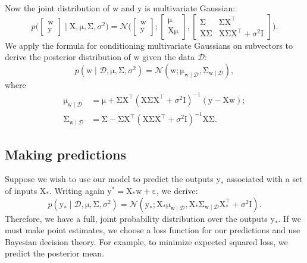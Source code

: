 \documentclass{article}
\newcommand{\given}{\mid}
\newcommand{\mc}[1]{\mathcal{#1}}
\newcommand{\data}{\mc{D}}
\newcommand{\inv}{^{-1}}
\newcommand{\trans}{^\top}
\newcommand{\mat}[1]{\bm{\mathrm{#1}}}
\renewcommand{\vec}[1]{\bm{\mathrm{#1}}}
\renewcommand{\epsilon}{\varepsilon}
\begin{document}
Now the joint distribution of $\vec{w}$ and $\vec{y}$ is multivariate
Gaussian:
\begin{equation*}
  p\Biggl(
  \begin{bmatrix}
    \vec{w}
    \\
    \vec{y}
  \end{bmatrix}
  \given
  \vec{X}, \vec{\mu}, \mat{\Sigma}, \sigma^2
  \Biggr)
  =
  \mc{N}
  \Biggl(
  \begin{bmatrix}
    \vec{w}
    \\
    \vec{y}
  \end{bmatrix}
  ;
  \begin{bmatrix}
    \vec{\mu}
    \\
    \mat{X}\vec{\mu}
  \end{bmatrix}
  ,
  \begin{bmatrix}
    \mat{\Sigma} & \mat{\Sigma}\mat{X}\trans
    \\
    \mat{X}\mat{\Sigma} & \mat{X}\mat{\Sigma}\mat{X}\trans + \sigma^2\mat{I}
  \end{bmatrix}
  \Biggr).
\end{equation*}
We apply the formula for conditioning multivariate Gaussians on
subvectors to derive the posterior distribution of $\vec{w}$ given
the data $\data$:
\begin{equation*}
  p(\vec{w} \given \data, \vec{\mu}, \mat{\Sigma}, \sigma^2)
  =
  \mc{N}(\vec{w};
  \vec{\mu}_{\vec{w}\given\data},
  \mat{\Sigma}_{\vec{w}\given\data}
  ),
\end{equation*}
where
\begin{align*}
  \vec{\mu}_{\vec{w}\given\data}
  &=
  \vec{\mu}
  +
  \mat{\Sigma}
  \mat{X}\trans
  (\mat{X}\mat{\Sigma}\mat{X}\trans + \sigma^2 \mat{I})\inv
  (\vec{y} - \mat{X}\vec{w});
  \\
  \mat{\Sigma}_{\vec{w}\given\data}
  &=
  \mat{\Sigma}
  -
  \mat{\Sigma}
  \mat{X}\trans
  (\mat{X}\mat{\Sigma}\mat{X}\trans + \sigma^2 \mat{I})\inv
  \mat{X}
  \mat{\Sigma}.
\end{align*}

\subsection*{Making predictions}

Suppose we wish to use our model to predict the outputs $\vec{y}_\ast$
associated with a set of inputs $\mat{X}_\ast$.  Writing again
$\vec{y}^\ast = \mat{X}_\ast\vec{w} + \vec{\epsilon}$, we derive:
\begin{equation*}
  p(\vec{y}_\ast \given \data, \vec{\mu}, \mat{\Sigma}, \sigma^2)
  =
  \mc{N}(
  \vec{y}_\ast;
  \mat{X}_\ast \vec{\mu}_{\vec{w}\given\data},
  \mat{X}_\ast \mat{\Sigma}_{\vec{w}\given\data} \mat{X}_\ast\trans + \sigma^2 \mat{I}).
\end{equation*}
Therefore, we have a full, joint probability distribution over the
outputs $\vec{y}_\ast$.  If we must make point estimates, we choose a
loss function for our predictions and use Bayesian decision theory.
For example, to minimize expected squared loss, we predict the
posterior mean.
\end{document}
